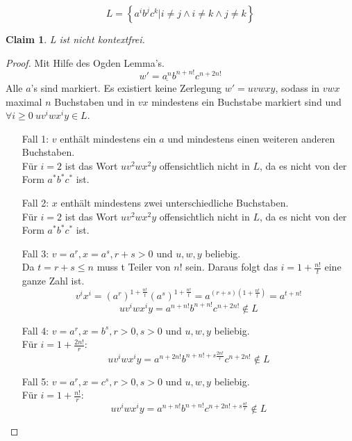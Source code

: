 \documentclass[]{article}
\newtheorem{claim}[theorem]{Claim}
\begin{document}
$$L=\left\lbrace a^ib^jc^k|i\neq j \wedge i\neq k \wedge j\neq k \right\rbrace$$
\begin{claim}
L ist nicht kontextfrei.
\end{claim}
\begin{proof}
Mit Hilfe des Ogden Lemma's.
$$w'=\underline{a^n}b^{n+n!}c^{n+2n!}$$
Alle $a$'s sind markiert.
Es existiert keine Zerlegung $w'=uvwxy$, sodass in $vwx$ maximal $n$ Buchstaben und in $vx$ mindestens ein Buchstabe markiert sind und $\forall i\geq0\ uv^iwx^iy\in L$.
\begin{itemize}
\item[Fall 1:] $v$ enth\"alt mindestens ein $a$ und mindestens einen weiteren anderen Buchstaben.\\ 
F\"ur $i=2$ ist das Wort $uv^2wx^2y$ offensichtlich nicht in $L$, da es nicht von der Form $a^*b^*c^*$ ist.
\item[Fall 2:] $x$ enth\"alt mindestens zwei unterschiedliche Buchstaben.\\ 
F\"ur $i=2$ ist das Wort $uv^2wx^2y$ offensichtlich nicht in $L$, da es nicht von der Form $a^*b^*c^*$ ist.
\item[Fall 3:] $v=a^r,x=a^s,r+s>0$ und $u,w,y$ beliebig.\\
Da $t=r+s\leq n$ muss t Teiler von $n!$ sein.
Daraus folgt das $i=1+\frac{n!}{t}$ eine ganze Zahl ist. 
$$v^ix^i=(a^{r})^{1+\frac{n!}{t}}(a^{s})^{1+\frac{n!}{t}}=a^{(r+s)(1+\frac{n!}{t})}=a^{t+n!}$$
$$uv^iwx^iy=a^{n+n!}b^{n+n!}c^{n+2n!}\notin L$$
\item[Fall 4:] $v=a^r,x=b^s,r>0,s>0$ und $u,w,y$ beliebig.\\
F\"ur $i=1+\frac{2n!}{r}$:
$$uv^iwx^iy=a^{n+2n!}b^{n+n!+s\frac{2n!}{r}}c^{n+2n!}\notin L$$
\item[Fall 5:] $v=a^r,x=c^s,r>0,s>0$ und $u,w,y$ beliebig.\\
F\"ur $i=1+\frac{n!}{r}$:
$$uv^iwx^iy=a^{n+n!}b^{n+n!}c^{n+2n!+s\frac{n!}{r}}\notin L$$
\end{itemize}
\end{proof}
\end{document}
